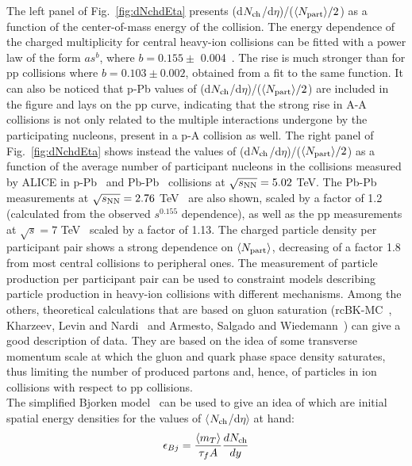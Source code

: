The left panel of Fig.~\ref{fig:dNchdEta} presents (d$N_{\rm ch}$/d$\eta$)/($\langle N_{\rm part} \rangle/2$) as a function of the center-of-mass energy of the collision. The energy dependence of the charged multiplicity for central heavy-ion collisions can be fitted with a power law of the form $as^b$, where $b = 0.155 \pm$ 0.004~\cite{Adam:2015ptt}. The rise is much stronger than for pp collisions where $b = 0.103 \pm 0.002$, obtained from a fit to the same function. It can also be noticed that p-Pb values of (d$N_{\rm ch}$/d$\eta$)/($\langle N_{\rm part} \rangle/2$) are included in the figure and lays on the pp curve, indicating that the strong rise in A-A collisions is not only related to the multiple interactions undergone by the participating nucleons, present in a p-A collision as well. The right panel of Fig.~\ref{fig:dNchdEta} shows instead the values of (d$N_{\rm ch}$/d$\eta$)/($\langle N_{\rm part} \rangle/2$) as a function of the average number of participant nucleons in the collisions measured by ALICE in p-Pb~\cite{ALICE:2012xs} and Pb-Pb~\cite{Adam:2015ptt} collisions at $\sqrt{s_{\rm NN}} = 5.02$ TeV. The Pb-Pb measurements at $\sqrt{s_{\rm NN}} = 2.76 $ TeV~\cite{Aamodt:2010cz} are also shown, scaled by a factor of 1.2 (calculated from the observed $s^{0.155}$ dependence), as well as the pp measurements at $\sqrt{s}= 7$ TeV~\cite{Adam:2015gka} scaled by a factor of 1.13. The charged particle density per participant pair shows a strong dependence on $\langle N_{\rm part}\rangle$, decreasing of a factor 1.8 from most central collisions to peripheral ones. The measurement of particle production per participant pair can be used to constraint models describing particle production in heavy-ion collisions with different mechanisms. Among the others, theoretical calculations that are based on gluon saturation (rcBK-MC~\cite{Albacete:2011fw}, Kharzeev, Levin and Nardi~\cite{Kharzeev:2004if} and Armesto, Salgado and Wiedemann~\cite{Armesto:2004ud}) can give a good description of data. They are based on the idea of some transverse momentum scale at which the gluon and quark phase space density saturates, thus limiting the number of produced partons and, hence, of particles in ion collisions with respect to pp collisions.  \\
The simplified Bjorken model~\cite{Bjorken:1982qr} can be used to give an idea of which are initial spatial energy densities for the values of $\langle$$N_{\rm ch}$/d$\eta$$\rangle$ at hand:
\begin{equation}
\label{Bjorken}
\epsilon_{Bj} = \frac{\langle m_T\rangle}{\tau_f A}\frac{dN_{\rm ch}}{dy}
\end{equation}
